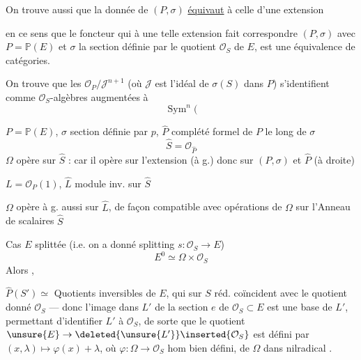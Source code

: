 On trouve aussi que la donnée de $(P,\sigma)$ \uline{équivaut} à celle d'une extension

en ce sens que le  foncteur qui à une telle extension fait correspondre $(P,\sigma)$ avec $P=\mathbb{P}(E)$ et $\sigma$ la section définie par le quotient  $\mathcal{O}_S$ de $E$, est une équivalence de catégories.

On trouve que les $\mathcal{O}_P/\mathcal{J}^{n+1}$ (où $\mathcal{J}$ est l'idéal de $\sigma(S)$ dans $P$) s'identifient comme $\mathcal{O}_S$-algèbres augmentées à
\[
\operatorname{Sym}^n(
\]

$P=\mathbb{P}(E)$, $\sigma$ section définie par $p$, $\widehat P$ complété formel de $P$ le long de $\sigma$
\[
\widehat S=\mathcal{O}_{\widehat P}
\]
$\Omega$ opère  sur $\widehat S$ : car il opère sur l'extension (à g.) donc sur $(P,\sigma)$ et $\widehat P$ (à droite)

$L=\mathcal{O}_P(1)$, $\widehat L$ module inv. sur $\widehat S$

$\Omega$ opère à g. aussi sur $\widehat L$, de façon compatible avec opérations de $\Omega$ sur l'Anneau de scalaires $\widehat S$

Cas $E$  splittée (i.e. on a donné splitting $s:\mathcal{O}_S\to E$)
\[
E^0\simeq\Omega\times\mathcal{O}_S
\]
Alors ,

 $\widehat P(S')\simeq$ Quotients inversibles  de $E$, qui sur $S$ réd. coïncident avec le quotient donné $\mathcal{O}_S$ --- donc l'image dans $L'$ de la section $e$ de $\mathcal{O}_S\subset E$ est une base de $L'$, permettant d'identifier $L'$ à $\mathcal{O}_S$, de sorte que le quotient $\unsure{E}\to\deleted{\unsure{L'}}\inserted{\mathcal{O}_S}$ est défini par $(x,\lambda)\longmapsto\varphi(x)+\lambda$, où $\varphi:\Omega\to\mathcal{O}_S$ hom bien défini, de $\Omega$ dans nilradical .

